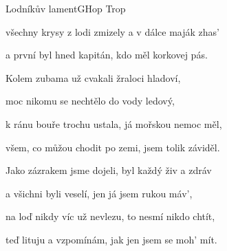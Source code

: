 \begin{song}{Lodníkův lament}{G}{Hop Trop}
\begin{SBVerse}
všechny krysy z lodi zmizely a v dálce maják zhas'

a první byl hned kapitán, kdo měl korkovej pás.

\end{SBVerse}

\begin{SBChorus}

\end{SBChorus}

\clearpage

\begin{SBVerse}

Kolem zubama už cvakali žraloci hladoví,

moc nikomu se nechtělo do vody ledový,

k ránu bouře trochu ustala, já mořskou nemoc měl,

všem, co můžou chodit po zemi, jsem tolik záviděl.

\end{SBVerse}

\begin{SBChorus}

\end{SBChorus}

\begin{SBVerse}

Jako zázrakem jsme dojeli, byl každý živ a zdráv

a všichni byli veselí, jen já jsem rukou máv',

na loď nikdy víc už nevlezu, to nesmí nikdo chtít,

teď lituju a vzpomínám, jak jen jsem se moh' mít.

\end{SBVerse}

\begin{SBChorus}

\end{SBChorus}

\end{song}

\clearpage
